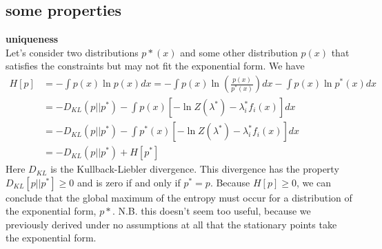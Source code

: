 \documentclass[a4paper,12pt]{article}
\begin{document}
\subsection{some properties}
\textbf{uniqueness} \\
Let's consider two distributions $p*(x)$ and some other distribution $p(x)$ that satisfies the constraints but may not fit the exponential form. We have
\begin{align}
H[p] &= - \int p(x) \ln p(x) dx = - \int p(x) \ln \left( \frac{p(x)}{p^*(x)} \right) dx - \int p(x) \ln p^*(x) dx \, \\
& = -D_{KL}(p || p^*) - \int p(x) \left[- \ln Z(\lambda^*) - \lambda_i^* f_i(x) \right] dx \\
& = -D_{KL}(p || p^*) - \int p^*(x) \left[  -\ln Z(\lambda^*) - \lambda_i^* f_i(x)  \right] dx \\
& = -D_{KL}(p || p^*) + H[p^*]
\end{align}
Here $D_{KL}$ is the Kullback-Liebler divergence. This divergence has the property $D_{KL}[p||p^*] \ge 0$ and is zero if and only if $p^* = p$. Because $H[p]\ge 0$, we can conclude that the global maximum of the entropy must occur for a distribution of the exponential form, $p*$. N.B. this doesn't seem too useful, because we previously derived under no assumptions at all that the stationary points take the exponential form.
\end{document}
